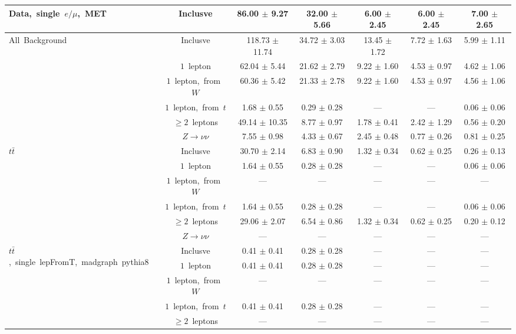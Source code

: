 \documentclass{article}
\begin{document}
\begin{longtable}{|l|c|c|c|c|c|c|}
\multirow{1}{*}{Data,~single~$e/\mu$,~MET} & Inclusve  & 86.00 $\pm$ 9.27  & 32.00 $\pm$ 5.66  & 6.00 $\pm$ 2.45  & 6.00 $\pm$ 2.45  & 7.00 $\pm$ 2.65 \\* 
\hline \hline 
\multirow{6}{*}{All~Background} & Inclusve  & 118.73 $\pm$ 11.74  & 34.72 $\pm$ 3.03  & 13.45 $\pm$ 1.72  & 7.72 $\pm$ 1.63  & 5.99 $\pm$ 1.11 \\* 
 & $1$~lepton  & 62.04 $\pm$ 5.44  & 21.62 $\pm$ 2.79  & 9.22 $\pm$ 1.60  & 4.53 $\pm$ 0.97  & 4.62 $\pm$ 1.06 \\* 
 & $1$~lepton,~from~$W$  & 60.36 $\pm$ 5.42  & 21.33 $\pm$ 2.78  & 9.22 $\pm$ 1.60  & 4.53 $\pm$ 0.97  & 4.56 $\pm$ 1.06 \\* 
 & $1$~lepton,~from~$t$  & 1.68 $\pm$ 0.55  & 0.29 $\pm$ 0.28  & ---  & ---  & 0.06 $\pm$ 0.06 \\* 
 & $\ge2$~leptons  & 49.14 $\pm$ 10.35  & 8.77 $\pm$ 0.97  & 1.78 $\pm$ 0.41  & 2.42 $\pm$ 1.29  & 0.56 $\pm$ 0.20 \\* 
 & $Z\rightarrow\nu\nu$  & 7.55 $\pm$ 0.98  & 4.33 $\pm$ 0.67  & 2.45 $\pm$ 0.48  & 0.77 $\pm$ 0.26  & 0.81 $\pm$ 0.25 \\* 
\hline 
\multirow{6}{*}{$t\bar{t}$} & Inclusve  & 30.70 $\pm$ 2.14  & 6.83 $\pm$ 0.90  & 1.32 $\pm$ 0.34  & 0.62 $\pm$ 0.25  & 0.26 $\pm$ 0.13 \\* 
 & $1$~lepton  & 1.64 $\pm$ 0.55  & 0.28 $\pm$ 0.28  & ---  & ---  & 0.06 $\pm$ 0.06 \\* 
 & $1$~lepton,~from~$W$  & ---  & ---  & ---  & ---  & --- \\* 
 & $1$~lepton,~from~$t$  & 1.64 $\pm$ 0.55  & 0.28 $\pm$ 0.28  & ---  & ---  & 0.06 $\pm$ 0.06 \\* 
 & $\ge2$~leptons  & 29.06 $\pm$ 2.07  & 6.54 $\pm$ 0.86  & 1.32 $\pm$ 0.34  & 0.62 $\pm$ 0.25  & 0.20 $\pm$ 0.12 \\* 
 & $Z\rightarrow\nu\nu$  & ---  & ---  & ---  & ---  & --- \\* 
\hline 
\multirow{6}{*}{$t\bar{t}$,~single~lepFromT,~madgraph~pythia8} & Inclusve  & 0.41 $\pm$ 0.41  & 0.28 $\pm$ 0.28  & ---  & ---  & --- \\* 
 & $1$~lepton  & 0.41 $\pm$ 0.41  & 0.28 $\pm$ 0.28  & ---  & ---  & --- \\* 
 & $1$~lepton,~from~$W$  & ---  & ---  & ---  & ---  & --- \\* 
 & $1$~lepton,~from~$t$  & 0.41 $\pm$ 0.41  & 0.28 $\pm$ 0.28  & ---  & ---  & --- \\* 
 & $\ge2$~leptons  & ---  & ---  & ---  & ---  & --- \\* 

\end{longtable}
\end{document}
